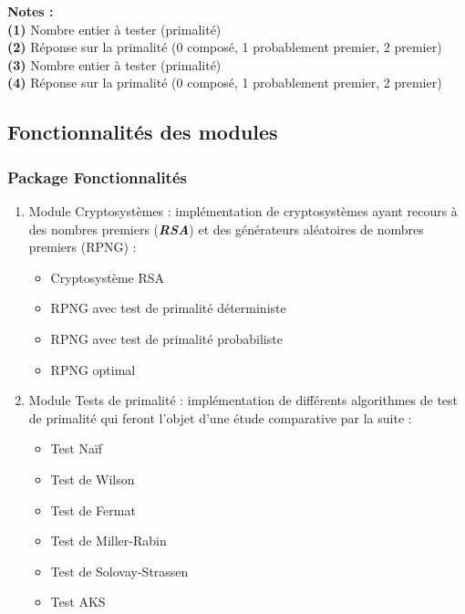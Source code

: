 	\vspace{1em}
	\hspace{-1.3em}\textbf{Notes :}\\
		\textbf{(1)} Nombre entier à tester (primalité)\\
		\textbf{(2)} Réponse sur la primalité (0 composé, 1 probablement premier, 2 premier)\\
		\textbf{(3)} Nombre entier à tester (primalité)\\
		\textbf{(4)} Réponse sur la primalité (0 composé, 1 probablement premier, 2 premier)\\
		
	
	\subsection{Fonctionnalités des modules}
		\subsubsection*{Package Fonctionnalités}
			\begin{enumerate}[leftmargin=*]
				\item Module Cryptosystèmes : implémentation de cryptosystèmes ayant recours à des nombres premiers (\textbf{\textit{RSA}}) et des générateurs aléatoires de nombres premiers (RPNG) :
				\begin{itemize}
					\item Cryptosystème RSA
					\item RPNG avec test de primalité déterministe
					\item RPNG avec test de primalité probabiliste
					\item RPNG optimal
				\end{itemize}
				\item Module Tests de primalité : implémentation de différents algorithmes de test de primalité qui feront l'objet d'une étude comparative par la suite :
				\begin{itemize}
					\item Test Naïf
					\item Test de Wilson
					\item Test de Fermat
					\item Test de Miller-Rabin
					\item Test de Solovay-Strassen
					\item Test AKS
				\end{itemize}
			\end{enumerate}
			
